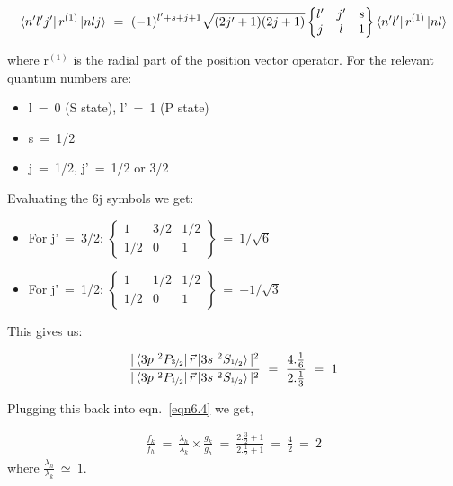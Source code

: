 {%
\begin{equation}
    \bra{n'l'j'}r^{(1)}\ket{nlj}~=~(-1)^{l'+s+j+1}\sqrt{(2j'+1)(2j+1)}
    \begin{Bmatrix}
    l' & j' & s\\
    j & l & 1
    \end{Bmatrix} \bra{n'l'}r^{(1)}\ket{nl}
\end{equation}

\noindent where $\mathrm{r^{(1)}}$ is the radial part of the position vector operator. For  the relevant quantum numbers are:

\begin{itemize}
    \item l~=~0 (S state), l'~=~1 (P state)
    \item s~=~1/2
    \item j~=~1/2, j'~=~1/2 or 3/2
\end{itemize}

\noindent Evaluating the 6j symbols we get:

\begin{itemize}
    \item For j'~=~3/2: 
        $\begin{Bmatrix}
            1 & 3/2 & 1/2\\
            1/2 & 0 & 1
        \end{Bmatrix}$~=~$1/\sqrt{6}$

    \item For j'~=~1/2:
        $\begin{Bmatrix}
            1 & 1/2 & 1/2\\
            1/2 & 0 & 1
        \end{Bmatrix}$~=~$-1/\sqrt{3}$
\end{itemize}

\noindent This gives us:

\begin{equation}
    \frac{|\bra{3p~^{2}P_{\nicefrac{3}{2}}}\vec{r}\ket{3s~^{2}S_{\nicefrac{1}{2}}}|^{2}}{|\bra{3p~^{2}P_{\nicefrac{1}{2}}}\vec{r}\ket{3s~^{2}S_{\nicefrac{1}{2}}}|^{2}}~=~\frac{4.\frac{1}{6}}{2.\frac{1}{3}}~=~1
\end{equation}

Plugging this back into eqn.~\ref{eqn6.4} we get,

\begin{align*}
    \frac{f_k}{f_h}~=~\frac{\lambda_h}{\lambda_k}\times \frac{g_k}{g_h}~=~\frac{2.\frac{3}{2}+1}{2.\frac{1}{2}+1}~=~\frac{4}{2}~=~2
\end{align*}
\noindent where $\frac{\lambda_h}{\lambda_k}~\simeq~1$.}


\renewcommand{\thesection}{\thechapter.\arabic{section}}


